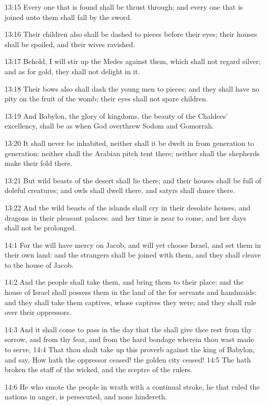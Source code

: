 13:15 Every one that is found shall be thrust through; and every one
that is joined unto them shall fall by the sword.

13:16 Their children also shall be dashed to pieces before their eyes;
their houses shall be spoiled, and their wives ravished.

13:17 Behold, I will stir up the Medes against them, which shall not
regard silver; and as for gold, they shall not delight in it.

13:18 Their bows also shall dash the young men to pieces; and they
shall have no pity on the fruit of the womb; their eyes shall not
spare children.

13:19 And Babylon, the glory of kingdoms, the beauty of the Chaldees'
excellency, shall be as when God overthrew Sodom and Gomorrah.

13:20 It shall never be inhabited, neither shall it be dwelt in from
generation to generation: neither shall the Arabian pitch tent there;
neither shall the shepherds make their fold there.

13:21 But wild beasts of the desert shall lie there; and their houses
shall be full of doleful creatures; and owls shall dwell there, and
satyrs shall dance there.

13:22 And the wild beasts of the islands shall cry in their desolate
houses, and dragons in their pleasant palaces: and her time is near to
come, and her days shall not be prolonged.

14:1 For the \LORD will have mercy on Jacob, and will yet choose
Israel, and set them in their own land: and the strangers shall be
joined with them, and they shall cleave to the house of Jacob.

14:2 And the people shall take them, and bring them to their place:
and the house of Israel shall possess them in the land of the \LORD for
servants and handmaids: and they shall take them captives, whose
captives they were; and they shall rule over their oppressors.

14:3 And it shall come to pass in the day that the \LORD shall give
thee rest from thy sorrow, and from thy fear, and from the hard
bondage wherein thou wast made to serve, 14:4 That thou shalt take up
this proverb against the king of Babylon, and say, How hath the
oppressor ceased! the golden city ceased!  14:5 The \LORD hath broken
the staff of the wicked, and the sceptre of the rulers.

14:6 He who smote the people in wrath with a continual stroke, he that
ruled the nations in anger, is persecuted, and none hindereth.

